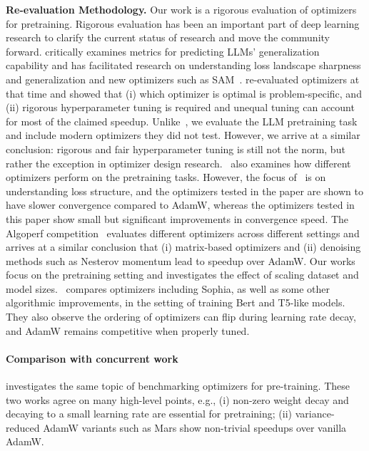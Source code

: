 \textbf{Re-evaluation Methodology.} Our work is a rigorous evaluation of optimizers for pretraining. Rigorous evaluation has been an important part of deep learning research to clarify the current status of research and move the community forward. \cite{jiang2019fantasticgeneralizationmeasures} critically examines metrics for predicting LLMs' generalization capability and has facilitated research on understanding loss landscape sharpness and generalization and new optimizers such as SAM~\cite{foret2021sharpnessawareminimizationefficientlyimproving}. \cite{schmidt2021descendingcrowdedvalley} re-evaluated optimizers at that time and showed that (i) which optimizer is optimal is problem-specific, and (ii) rigorous hyperparameter tuning is required and unequal tuning can account for most of the claimed speedup. Unlike~\cite{schmidt2021descendingcrowdedvalley}, we evaluate the LLM pretraining task and include modern optimizers they did not test. However, we arrive at a similar conclusion: rigorous and fair hyperparameter tuning is still not the norm, but rather the exception in optimizer design research.~\cite{zhao2025deconstructingmakesgoodoptimizer} also examines how different optimizers perform on the pretraining tasks. However, the focus of~\cite{zhao2025deconstructingmakesgoodoptimizer} is on understanding loss structure, and the optimizers tested in the paper are shown to have slower convergence compared to AdamW, whereas the optimizers tested in this paper show small but significant improvements in convergence speed. The Algoperf competition~\cite{kasimbeg2025acceleratingneuralnetworktraining} evaluates different optimizers across different settings and arrives at a similar conclusion that (i) matrix-based optimizers and (ii) denoising methods such as Nesterov momentum lead to speedup over AdamW. Our works focus on the pretraining setting and investigates the effect of scaling dataset and model sizes.~\citet{kaddour2023traingainrevisitingefficient} compares optimizers including Sophia, as well as some other algorithmic improvements, in the setting of training Bert and T5-like models. They also observe the ordering of optimizers can flip during learning rate decay, and AdamW remains competitive when properly tuned.

\paragraph{Comparison with concurrent work~\citet{semenov2025benchmarkingoptimizerslargelanguage}} \citet{semenov2025benchmarkingoptimizerslargelanguage} investigates the same topic of benchmarking optimizers for pre-training. These two works agree on many high-level points, e.g., (i) non-zero weight decay and decaying to a small learning rate are essential for pretraining; (ii) variance-reduced AdamW variants such as Mars show non-trivial speedups over vanilla AdamW. 

